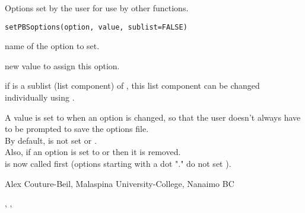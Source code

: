 \documentclass[letterpaper]{book}
\begin{document}
\begin{Description}\relax
Options set by the user for use by other functions.
\end{Description}
\begin{Usage}
\begin{verbatim}
setPBSoptions(option, value, sublist=FALSE)
\end{verbatim}
\end{Usage}
\begin{Arguments}
\begin{ldescription}
\item[\code{option}] name of the option to set.
\item[\code{value}] new value to assign this option.
\item[\code{sublist}] if  is a sublist (list component) of ,
this list component can be changed individually using .
\end{ldescription}
\end{Arguments}
\begin{Note}\relax
A value  is set to  when an option is changed,
so that the user doesn't always have to be prompted to save the options file. \\
By default,  is not set or . \\
Also, if an option is set to  or  then it is removed. \\
 is now called first (options starting with a dot "." 
do not set ).
\end{Note}
\begin{Author}\relax
Alex Couture-Beil, Malaspina University-College, Nanaimo BC
\end{Author}
\begin{SeeAlso}\relax
{}, ,
\end{SeeAlso}
\end{document}

